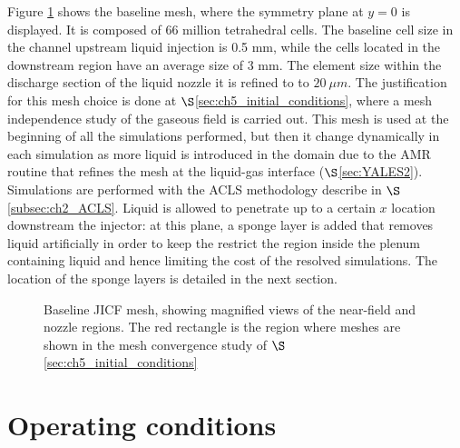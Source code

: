 Figure \ref{fig:jicf_dlr_mesh} shows the baseline mesh, where the symmetry plane at $y = 0$ is displayed. It is composed of 66 million tetrahedral cells. The baseline cell size in the channel upstream liquid injection is 0.5 mm, while the cells located in the downstream region have an average size of 3 mm. The element size within the discharge section of the liquid nozzle it is refined to to $20~\mu m$. The justification for this mesh choice is done at $\S$\ref{sec:ch5_initial_conditions}, where a mesh independence study of the gaseous field is carried out. This mesh is used at the beginning of all the simulations performed, but then it change dynamically in each simulation as more liquid is introduced in the domain due to the AMR routine that refines the mesh at the liquid-gas interface ($\S$\ref{sec:YALES2}). Simulations are performed with the ACLS methodology describe in $\S$\ref{subsec:ch2_ACLS}. Liquid is allowed to penetrate up to a certain $x$ location downstream the injector: at this plane, a sponge layer is added that removes liquid artificially in order to keep the restrict the region inside the plenum containing liquid and hence limiting the cost of the resolved simulations. The location of the sponge layers is detailed in the next section.

\begin{figure}[h!]
	\centering
	\caption[Baseline JICF mesh, showing magnified views of the near-field and nozzle regions.]{Baseline JICF mesh, showing magnified views of the near-field and nozzle regions. The red rectangle is the region where meshes are shown in the mesh convergence study of $\S$\ref{sec:ch5_initial_conditions}}
	\label{fig:jicf_dlr_mesh}
\end{figure}



\section{Operating conditions}


